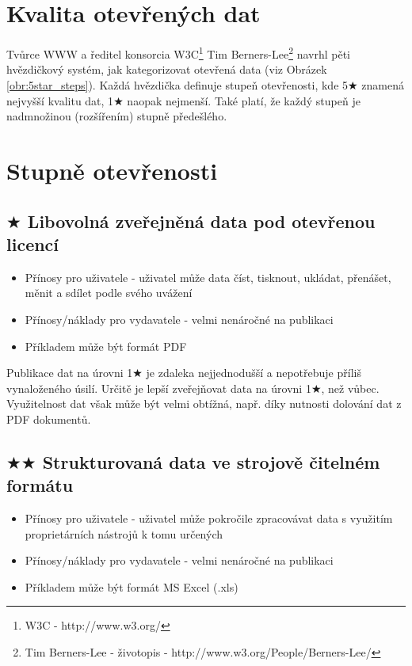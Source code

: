 \section{Kvalita otevřených dat}

Tvůrce WWW a ředitel konsorcia W3C\footnote{W3C - http://www.w3.org/} Tim Berners-Lee\footnote{Tim Berners-Lee - životopis - http://www.w3.org/People/Berners-Lee/} navrhl pěti hvězdičkový systém, jak kategorizovat otevřená data (viz Obrázek \ref{obr:5star_steps}). Každá hvězdička definuje stupeň otevřenosti, kde 5$\bigstar$ znamená nejvyšší kvalitu dat, 1$\bigstar$ naopak nejmenší. Také platí, že každý stupeň je nadmnožinou (rozšířením) stupně předešlého.

\section{Stupně otevřenosti\protect\cite{5starInfo}}

\subsection*{$\bigstar$ Libovolná zveřejněná data pod otevřenou licencí}

\medskip

\begin{itemize}
\item Přínosy pro uživatele - uživatel může data číst, tisknout, ukládat, přenášet, měnit a sdílet podle svého uvážení
\item Přínosy/náklady pro vydavatele - velmi nenáročné na publikaci
\item Příkladem může být formát PDF
\end{itemize}

Publikace dat na úrovni 1$\bigstar$ je zdaleka nejjednodušší a nepotřebuje příliš vynaloženého úsilí. Určitě je lepší zveřejňovat data na úrovni 1$\bigstar$, než vůbec. Využitelnost dat však může být velmi obtížná, např. díky nutnosti dolování dat z PDF dokumentů.

\subsection*{$\bigstar\bigstar$ Strukturovaná data ve strojově čitelném formátu}

\medskip

\begin{itemize}
\item Přínosy pro uživatele - uživatel může pokročile zpracovávat data s využitím proprietárních nástrojů k tomu určených
\item Přínosy/náklady pro vydavatele - velmi nenáročné na publikaci
\item Příkladem může být formát MS Excel (.xls)
\end{itemize}

